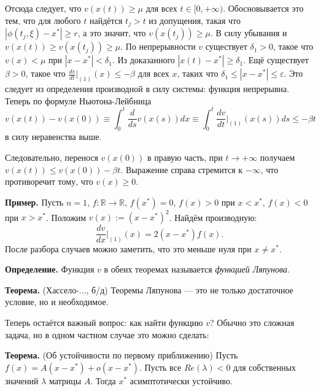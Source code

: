 Отсюда следует, что $v(x(t)) \ge \mu$ для всех $t \in [0, +\infty)$.
Обосновывается это тем, что для любого $t$ найдётся $t_j > t$ из допущения, такая что $|\phi(t_j, \xi) - x^*| \ge r$, а это значит, что $v(x(t_j)) \ge \mu$.
В силу убывания и $v(x(t)) \ge v(x(t_j)) \ge \mu$.
По непрерывности $v$ существует $\delta_1 > 0$, такое что $v(x) < \mu$ при $|x - x^*| < \delta_1$.
Из доказанного $|x(t) - x^*| \ge \delta_1$.
Ещё существует $\beta > 0$, такое что $\frac{dv}{dt} \big|_{(1)}(x) \le -\beta$ для всех $x$, таких что $\delta_1 \le |x - x^*| \le \varepsilon$.
Это следует из определения производной в силу системы: функция непрерывна.
Теперь по формуле Ньютона-Лейбница
\[
    v(x(t)) - v(x(0)) \equiv \int_0^t \frac{d}{ds} v(x(s)) dx \equiv \int_0^t \frac{dv}{dt} \bigg|_{(1)}(x(s)) ds \le -\beta t
\]
в силу неравенства выше.

Следовательно, перенося $v(x(0))$ в правую часть, при $t \to +\infty$ получаем $v(x(t)) \le v(x(0)) - \beta t$.
Выражение справа стремится к $-\infty$, что противоречит тому, что $v(x) \ge 0$.

\QED

\textbf{Пример.} Пусть $n = 1$, $f: \mathbb R \to \mathbb R$, $f(x^*) = 0$, $f(x) > 0$ при $x < x^*$, $f(x) < 0$ при $x > x^*$.
Положим $v(x) := (x - x^*)^2$.
Найдём производную:
\[
    \frac{dv}{dx} \bigg|_{(1)} (x) = 2(x - x^*) f(x).
\]
После разбора случаев можно заметить, что это меньше нуля при $x \ne x^*$.

\textbf{Определение.} Функция $v$ в обеих теоремах называется \textit{функцией Ляпунова}.

\textbf{Теорема.} (Хассело-..., б/д) Теоремы Ляпунова --- это не только достаточное условие, но и необходимое.

Теперь остаётся важный вопрос: как найти функцию $v$?
Обычно это сложная задача, но в одном частном случае это можно сделать:

\textbf{Теорема.} (Об устойчивости по первому приближению) Пусть $f(x) = A(x - x^*) + o(x - x^*)$.
Пусть все $Re(\lambda) < 0$ для собственных значений $\lambda$ матрицы $A$.
Тогда $x^*$ асимптотически устойчиво.


